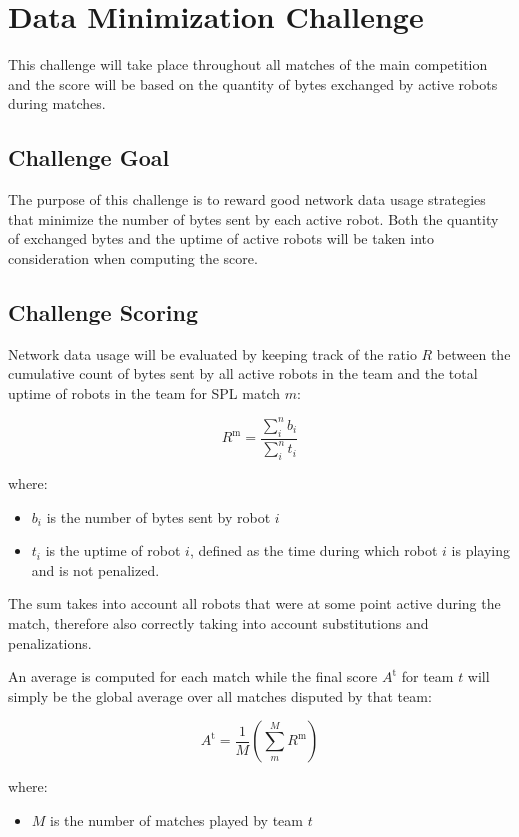 \section{Data Minimization Challenge} %
This challenge will take place throughout all matches of the main competition and the score will be based on the quantity of bytes exchanged by active robots during matches. 


\subsection{Challenge Goal}
The purpose of this challenge is to reward good network data usage strategies that minimize the number of bytes sent by each active robot. Both the quantity of exchanged bytes and the uptime of active robots will be taken into consideration when computing the score.

\subsection{Challenge Scoring}
Network data usage will be evaluated by keeping track of the ratio $R$ between the cumulative count of bytes sent by all active robots in the team and the total uptime of robots in the team for SPL match $m$:

$$ R^\text{m} = \frac{\sum_{i}^n b_i}{\sum_{i}^n t_i} $$

where:
\begin{itemize}
    \item $b_i$ is the number of bytes sent by robot $i$
    \item $t_i$ is the uptime of robot $i$, defined as the time during which robot $i$ is playing and is not penalized.
\end{itemize}
The sum takes into account all robots that were at some point active during the match, therefore also correctly taking into account substitutions and penalizations.

An average is computed for each match while the final score $A^\text{t}$ for team $t$ will simply be the global average over all matches disputed by that team:

$$ A^\text{t} = \frac{1}{M} \left( \sum_{m}^M R^\text{m} \right) $$

where:
\begin{itemize}
    \item $M$ is the number of matches played by team $t$
\end{itemize}


